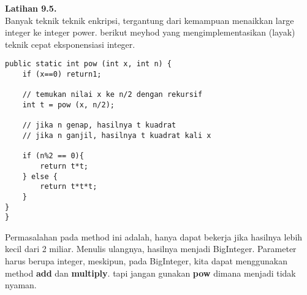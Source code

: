 \textbf{Latihan 9.5.}\\
Banyak teknik teknik enkripsi, tergantung dari kemampuan menaikkan large integer ke integer power. berikut meyhod yang mengimplementasikan (layak) teknik cepat eksponensiasi integer.
\begin{lstlisting}
public static int pow (int x, int n) {
	if (x==0) return1;
	
	// temukan nilai x ke n/2 dengan rekursif
	int t = pow (x, n/2);
	
	// jika n genap, hasilnya t kuadrat
	// jika n ganjil, hasilnya t kuadrat kali x
	
	if (n%2 == 0){
		return t*t;
	} else {
		return t*t*t;
	}
}			
}
\end{lstlisting}
Permasalahan pada method ini adalah, hanya dapat bekerja jika hasilnya lebih kecil dari 2 miliar. Menulis ulangnya, hasilnya menjadi BigInteger. Parameter harus berupa integer, meskipun, pada BigInteger, kita dapat menggunakan method \textbf{add} dan \textbf{multiply}. tapi jangan gunakan \textbf{pow} dimana menjadi tidak nyaman.

